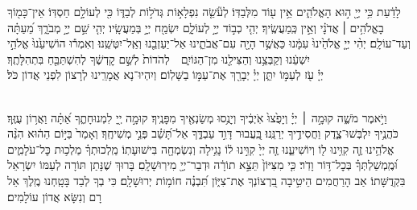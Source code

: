 \documentclass[twoside, openany, parskip=half, 11pt]{book}
\begin{document}
לָדַ֔עַת כִּ֥י יְיָ֖ ה֣וּא הָאֱלֹהִ֑ים אֵ֥ין ע֖וֹד מִלְּבַדּֽוֹ׃ \hfill \break
לְעֹ֘שֵׂ֤ה נִפְלָא֣וֹת גְּדֹל֣וֹת לְבַדּ֑וֹ כִּ֖י לְעוֹלָ֣ם חַסְדּֽוֹ׃ \hfill \break
אֵין־כָּמ֖וֹךָ  בָאֱלֹהִ֥ים ׀ אֲדֹנָ֗י וְאֵ֣ין כְּֽמַעֲשֶֽׂיךָ׃  \hfill \break
יְהִ֤י כְב֣וֹד יְיָ֣ לְעוֹלָ֑ם יִשְׂמַ֖ח יְיָ֣ בְּמַעֲשָֽׂיו׃  \hfill \break
יְהִ֤י שֵׁ֣ם יְיָ֣ מְבֹרָ֑ךְ מֵ֝עַתָּ֗ה וְעַד־עוֹלָֽם׃  \hfill \break
יְהִ֨י  יְיָ֤ אֱלֹהֵ֙ינוּ֙ עִמָּ֔נוּ כַּאֲשֶׁ֥ר הָיָ֖ה עִם־אֲבֹתֵ֑ינוּ אַל־יַעַזְבֵ֖נוּ וְאַֽל־יִטְּשֵֽׁנוּ׃ \hfill \break
וְאִמְר֕וּ  הוֹשִׁיעֵ֙נוּ֙ אֱלֹהֵ֣י יִשְׁעֵ֔נוּ וְקַבְּצֵ֥נוּ וְהַצִּילֵ֖נוּ מִן־הַגּוֹיִ֑ם לְהֹדוֹת֙ לְשֵׁ֣ם קׇדְשֶׁ֔ךָ לְהִשְׁתַּבֵּ֖חַ בִּתְהִלָּתֶֽךָ׃\\
\melekhmalakhyimlokh \hfill \break
יְיָ֗ עֹ֖ז לְעַמּ֣וֹ יִתֵּ֑ן יְיָ֓ יְבָרֵ֖ךְ אֶת־עַמּ֣וֹ בַשָּׁלֽוֹם׃ \hfill \break
וְיִהְיוּ־נָא אֲמָרֵֽינוּ לְרָצוֹן לִפְנֵי אֲדוֹן כֹּל׃ \hfill \break

\vspace{-1.3\baselineskip}

\\

 וַיֹּ֣אמֶר מֹשֶׁ֑ה קוּמָ֣ה ׀ יְיָ֗ וְיָפֻ֙צוּ֙ אֹֽיְבֶ֔יךָ וְיָנֻ֥סוּ מְשַׂנְאֶ֖יךָ מִפָּנֶֽיךָ׃\hfill \break
קוּמָ֣ה יְ֖יָ לִמְנוּחָתֶ֑ךָ אַ֝תָּ֗ה וַאֲר֥וֹן עֻזֶּֽךָ׃\hfill \break
כֹּהֲנֶ֥יךָ יִלְבְּשׁוּ־צֶ֑דֶק וַחֲסִידֶ֥יךָ יְרַנֵּֽנוּ׃\hfill \break
בַּֽ֭עֲבוּר דָּוִ֣ד עַבְדֶּ֑ךָ אַל־תָּ֝שֵׁ֗ב פְּנֵ֣י מְשִׁיחֶֽךָ׃ \hfill \break
וְאָמַר֙ בַּיּ֣וֹם הַה֔וּא הִנֵּ֨ה אֱלֹהֵ֥ינוּ זֶ֛ה קִוִּ֥ינוּ ל֖וֹ וְיוֹשִׁיעֵ֑נוּ זֶ֤ה יְיָ֙ קִוִּ֣ינוּ ל֔וֹ נָגִ֥ילָה וְנִשְׂמְחָ֖ה בִּישׁוּעָתֽוֹ׃\hfill \break
מַֽלְכוּתְךָ֗ מַלְכ֥וּת כׇּל־עֹלָמִ֑ים וּ֝מֶֽמְשַׁלְתְּךָ֗ בְּכׇל־דּ֥וֹר וָדֹֽר׃\hfill \break
כִּ֤י מִצִּיּוֹן֙ תֵּצֵ֣א תוֹרָ֔ה וּדְבַר־יְיָ֖ מִירֽוּשָׁלָֽםִ׃ \hfill \break
בָּרוּךְ שֶׁנָּתַן תּוֹרָה לְעַמּוֹ יִשְׂרָאֵל בִּקְדֻשָּׁתוֹ׃ \hfill \break
אַב הָרַחֲמִים  הֵיטִ֣יבָה בִ֭רְצוֹנְךָ אֶת־צִיּ֑וֹן תִּ֝בְנֶ֗ה חוֹמ֥וֹת יְרוּשָׁלָֽ‍ִם׃ \hfill \break
כִּי בְךָ לְבַד בָּטָֽחְנוּ מֶֽלֶךְ אֵל רָם וְנִשָּׂא אֲדוֹן עוֹלָמִים׃
\end{document}
